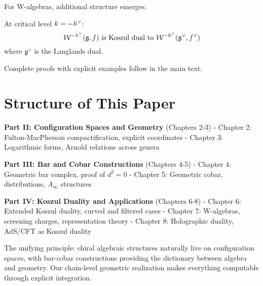 For W-algebras, additional structure emerges:

\begin{theorem}
At critical level $k = -h^\vee$:
$$\mathcal{W}^{-h^\vee}(\mathfrak{g}, f) \text{ is Koszul dual to } \mathcal{W}^{-h^\vee}(\mathfrak{g}^\vee, f^\vee)$$
where $\mathfrak{g}^\vee$ is the Langlands dual.
\end{theorem}

Complete proofs with explicit examples follow in the main text.


\section{Structure of This Paper}

\textbf{Part II: Configuration Spaces and Geometry} (Chapters 2-3)
- Chapter 2: Fulton-MacPherson compactification, explicit coordinates
- Chapter 3: Logarithmic forms, Arnold relations across genera

\textbf{Part III: Bar and Cobar Constructions} (Chapters 4-5)
- Chapter 4: Geometric bar complex, proof of $d^2 = 0$
- Chapter 5: Geometric cobar, distributions, $A_\infty$ structures

\textbf{Part IV: Koszul Duality and Applications} (Chapters 6-8)
- Chapter 6: Extended Koszul duality, curved and filtered cases
- Chapter 7: W-algebras, screening charges, representation theory
- Chapter 8: Holographic duality, AdS/CFT as Koszul duality

The unifying principle: chiral algebraic structures naturally live on configuration spaces, with bar-cobar constructions providing the dictionary between algebra and geometry. Our chain-level geometric realization makes everything computable through explicit integration.

